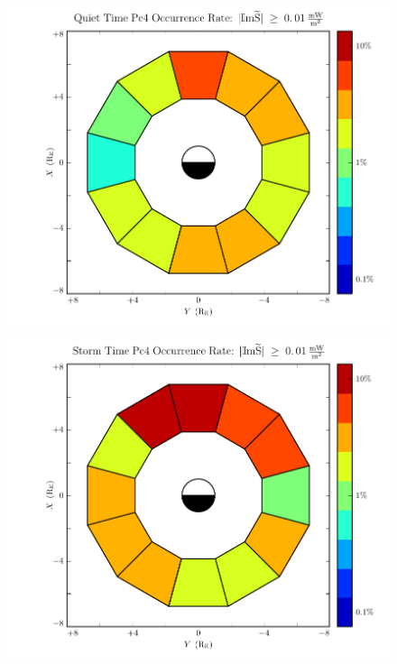 \begin{figure}[!htb]
    \centering
    \includegraphics[width=\textwidth]{figures/rate_calm.pdf}
    \caption[Pc4 Rate: Dst $\geq \SI{-30}{\nT}$]{
      \todo{$\cdots$}
    }
    \label{fig_rate_calm}
\end{figure}

\begin{figure}[!htb]
    \centering
    \includegraphics[width=\textwidth]{figures/rate_storm.pdf}
    \caption[Pc4 Rate: Dst $< \SI{-30}{\nT}$]{
      \todo{$\cdots$}
    }
    \label{fig_rate_storm}
\end{figure}









